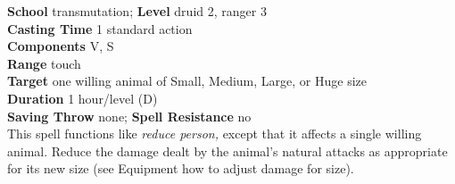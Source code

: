 \textbf{School} transmutation; \textbf{Level} druid 2, ranger 3\\
\textbf{Casting Time} 1 standard action\\
\textbf{Components} V, S\\
\textbf{Range} touch\\
\textbf{Target} one willing animal of Small, Medium, Large, or Huge size\\
\textbf{Duration} 1 hour/level (D)\\
\textbf{Saving Throw} none; \textbf{Spell Resistance} no\\
This spell functions like \textit{reduce person, }except that it affects a single willing animal. Reduce the damage dealt by the animal's natural attacks as appropriate for its new size (see Equipment how to adjust damage for size).\\
